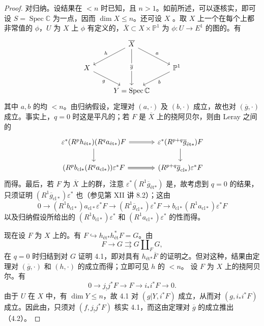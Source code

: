 \begin{proof}
对归纳。设结果在 $<n$ 时已知，且 $n>1$。如前所述，可以逐核实，即可设 $S=\operatorname{Spec}\mathbb C$ 为一点，因而 $\dim X\leq n$。还可设 $X$ 。取 $X$ 上一个在每个上都非常值的 $\phi$，$U$ 为 $X$ 上 $\phi$ 有定义的，$\overline X\subset X\times\mathbb P^1$ 为 $\phi:U\to E^1$ 的图的。有
\[
\begin{tikzcd}
&\overline X\arrow[dl,"h"']\arrow[dr,"a"]\arrow[dd,"\overline g" description]&\\
X\arrow[dr,"g"']&&\mathbb P^1\arrow[dl,"b"]\\
&Y=\operatorname{Spec}\mathbb C&
\end{tikzcd}
\]
其中 $a,b$ 的均 $<n$。由归纳假设，定理对 $(a,\cdot)$ 及 $(b,\cdot)$ 成立，故也对 $(\overline g,\cdot)$ 成立。事实上，$q=0$ 时这是平凡的；若 $F$ 是 $\overline X$ 上的挠阿贝尔，则由 Leray 之间的
\[
\begin{tikzcd}[column sep=large]
\varepsilon^*(R^ph_{\text{ét}*})(R^qa_{\text{ét}*})F\arrow[r,Rightarrow]\arrow[d]&\varepsilon^*(R^{p+q}\overline g_{\text{ét}*})F\arrow[d]\\
(R^pb_{\mathrm{cl}*}(R^qa_{\mathrm{cl}*}))\varepsilon^*F\arrow[r,Rightarrow]&(R^{p+q}\overline g_{\mathrm{cl}*})\varepsilon^*F
\end{tikzcd}
\]
而得。最后，若 $F$ 为 $\overline X$ 上的群，注意 $\varepsilon^*(R^1\overline g_{\text{ét}*})$ 是，故考虑到 $q=0$ 的结果，只须证明 $(R^1\overline g_{\mathrm{cl}*})\varepsilon^*$ 也（参见第 XII 讲 8.2）；这由
\[
0\longrightarrow(R^1b_{\mathrm{cl}*})a_{\mathrm{cl}*}\varepsilon^*F\longrightarrow(R^1\overline g_{\mathrm{cl}*})\varepsilon^*F\longrightarrow b_{\mathrm{cl}*}(R^1a_{\mathrm{cl}*})\varepsilon^*F
\]
以及归纳假设所给出的 $(R^1b_{\mathrm{cl}*})\varepsilon^*$ 和 $(R^1a_{\mathrm{cl}*})\varepsilon^*$ 的性而得。

现在设 $F$ 为 $X$ 上的。有 $F\hookrightarrow h_{\text{ét}*}h_{\text{ét}}^*F=G$。由
\[
F\longrightarrow G\rightrightarrows G\amalg_FG,\tag{4.3.1}
\]
在 $q=0$ 时归结到对 $G$ 证明 4.1，即对具有 $h_{\text{ét}*}\overline F$ 的证明之。但对这种，结果由定理对 $(\overline g,\cdot)$ 和 $(h,\cdot)$ 的成立而得；立即可见 $h$ 的 $<n$。
设 $F$ 为 $X$ 上的挠阿贝尔。有
\[
0\longrightarrow j_!j^*F\longrightarrow F\longrightarrow i_*i^*F\longrightarrow0.\tag{*}
\]
由于 $U$ 在 $X$ 中，有 $\dim Y\leq n$，故 4.1 对 $(g|Y,i^*F)$ 成立，从而对 $(g,i_*i^*F)$ 成立。因此由，只须对 $(f,j_!j^*F)$ 核实 4.1，而这由定理对 $\overline g$ 的成立推出（4.2）。


\end{proof}
